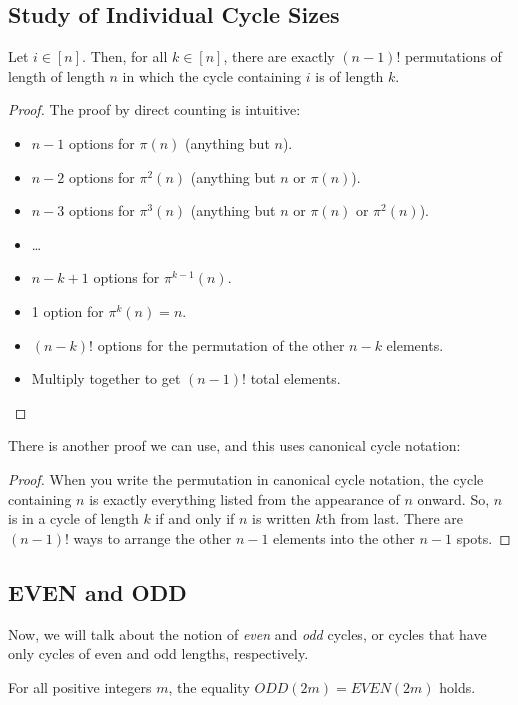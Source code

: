 \documentclass[letterpaper]{article}
\begin{document}
\subsection{Study of Individual Cycle Sizes}
\begin{lemma}{}{}
    Let $i \in [n]$. Then, for all $k \in [n]$, there are exactly $(n - 1)!$ permutations of length of length $n$ in which the cycle containing $i$ is of length $k$. 
\end{lemma}
\begin{proof}
    The proof by direct counting is intuitive:
    \begin{itemize}
        \item $n - 1$ options for $\pi(n)$ (anything but $n$).
        \item $n - 2$ options for $\pi^{2}(n)$ (anything but $n$ or $\pi(n)$).
        \item $n - 3$ options for $\pi^{3}(n)$ (anything but $n$ or $\pi(n)$ or $\pi^{2}(n)$).
        \item \dots
        \item $n - k + 1$ options for $\pi^{k - 1}(n)$.
        \item 1 option for $\pi^{k}(n) = n$. 
        \item $(n - k)!$ options for the permutation of the other $n - k$ elements.
        \item Multiply together to get $(n - 1)!$ total elements.  \qedhere 
    \end{itemize}
\end{proof}
There is another proof we can use, and this uses canonical cycle notation:
\begin{proof}
    When you write the permutation in canonical cycle notation, the cycle containing $n$ is exactly everything listed from the appearance of $n$ onward. So, $n$ is in a cycle of length $k$ if and only if $n$ is written $k$th from last. There are $(n - 1)!$ ways to arrange the other $n - 1$ elements into the other $n - 1$ spots.
\end{proof}

\subsection{EVEN and ODD}
Now, we will talk about the notion of \emph{even} and \emph{odd} cycles, or cycles that have only cycles of even and odd lengths, respectively. 

\begin{lemma}{}{}
    For all positive integers $m$, the equality $ODD(2m) = EVEN(2m)$ holds.
\end{lemma}
\end{document}

